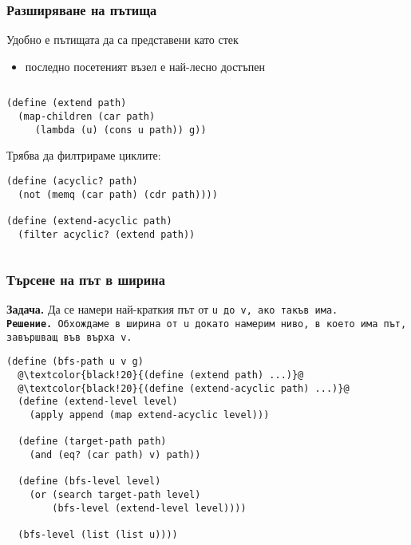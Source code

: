 \documentclass{beamer}
\begin{document}
\begin{frame}[fragile]
  \frametitle{Разширяване на пътища}

  Удобно е пътищата да са представени като \alert{стек}
  \begin{itemize}
  \item последно посетеният възел е най-лесно достъпен
  \end{itemize}
  \pause
  \begin{columns}[T]
    \begin{column}{0.65\textwidth}
      \pause
\begin{lstlisting}
(define (extend path)
  (map-children (car path)
     (lambda (u) (cons u path)) g))
\end{lstlisting}
      \pause
      Трябва да филтрираме циклите:
      \pause
\begin{lstlisting}
(define (acyclic? path)
  (not (memq (car path) (cdr path))))

(define (extend-acyclic path)
  (filter acyclic? (extend path))
\end{lstlisting}
    \end{column}
    \begin{column}{0.35\textwidth}
      \samplegraph
    \end{column}
  \end{columns}
\end{frame}

\begin{frame}[fragile]
  \frametitle{Търсене на път в ширина}

  \textbf{Задача.} Да се намери \alert{най-краткия} път от \tt u до \tt v, ако такъв има.\\
  \pause
  \textbf{Решение.} Обхождаме в ширина от \tt u докато намерим ниво, в което има път, завършващ във върха  \tt v.
  \pause
  \small
\begin{lstlisting}
(define (bfs-path u v g)
  @\textcolor{black!20}{(define (extend path) ...)}@
  @\textcolor{black!20}{(define (extend-acyclic path) ...)}@
  (define (extend-level level)
    (apply append (map extend-acyclic level)))

  (define (target-path path)
    (and (eq? (car path) v) path))

  (define (bfs-level level)
    (or (search target-path level)
        (bfs-level (extend-level level))))

  (bfs-level (list (list u))))
\end{lstlisting}
\end{frame}
\end{document}

